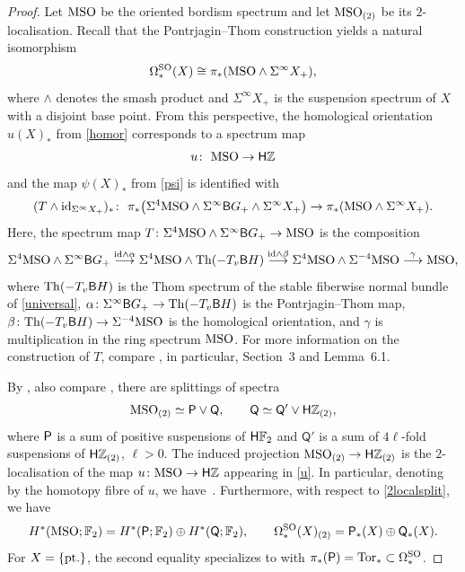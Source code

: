\documentclass[pdftex]{sigma}
\numberwithin{equation}{section}
\newcommand{\F}{\mathbb{F}}
\newcommand{\Z}{\mathbb{Z}}
\newcommand{\SO}{\mathrm{SO}}
\newcommand{\id}{{\rm id}}
\newcommand{\MSO}{{\rm MSO}}
\newcommand{\sB}{{\sf B}}
\newcommand{\Tor}{{\rm Tor}}
\begin{document}
\begin{proof}
Let $\MSO$ be the oriented bordism spectrum and let $\MSO_{(2)}$ be its $2$-localisation.
Recall that the Pontrjagin--Thom construction yields a natural isomorphism
\[
 \Omega^{\SO}_*(X) \cong \pi_*(\MSO \wedge \Sigma^{\infty} X_+),
\]
where $\wedge$ denotes the smash product and $\Sigma^{\infty} X_+$ is the suspension spectrum of $X$ with a disjoint base point.
From this perspective, the homological orientation $u(X)_*$ from \eqref{homor} corresponds to a spectrum map
\begin{equation} \label{u}
 u \colon\ \MSO \to \mathsf{H}\Z
\end{equation}
and the map $\psi(X)_*$ from \eqref{psi} is identified with
\[
(T \wedge \id_{\Sigma^{\infty} X_+})_* \colon\ \pi_*\big( \Sigma^4 \MSO \wedge \Sigma^{\infty} \sB G_+ \wedge \Sigma^{\infty} X_+\big) \to \pi_*(\MSO \wedge \Sigma^{\infty}X_+) .
\]
Here, the spectrum map $T \colon \Sigma^4 \MSO \wedge \Sigma^{\infty} \sB G_+ \to \MSO$ is the composition
\[
 \Sigma^4 \MSO \wedge \Sigma^{\infty} \sB G_+ \stackrel{\id \wedge \alpha}{\longrightarrow} \Sigma^4 \MSO \wedge {\rm Th}(-T_v \sB H) \stackrel{\id \wedge \beta}{\longrightarrow} \Sigma^4 \MSO \wedge \Sigma^{-4} \MSO \stackrel{\gamma}{\longrightarrow} \MSO,
 \]
where ${\rm Th}(-T_v \sB H)$ is the Thom spectrum of the stable fiberwise normal bundle of \eqref{universal}, $\alpha \colon \Sigma^{\infty} \sB G_+ \to {\rm Th}(-T_v \sB H)$ is the Pontrjagin--Thom map, $\beta \colon {\rm Th}(-T_v \sB H) \to \Sigma^{-4} \MSO$ is the homological orientation, and $\gamma$ is multiplication in the ring spectrum $\MSO$.
For more information on the construction of $T$, compare \cite{Fuehring_bordism}, in particular, Section~3 and Lemma~6.1.

By \cite[Theorem 5]{Wall60}, also compare \cite[proof of~Theorem 14.1]{CF}, there are splittings of spectra
\begin{gather} \label{2localsplit}
 \MSO_{(2)} \simeq \sf{P} \vee \sf{Q} , \qquad \sf{Q} \simeq \mathsf{Q'} \vee \mathsf{H} \Z_{(2)},
 \end{gather}
where $\sf{P}$ is a sum of positive suspensions of ${\sf H}\F_2$ and $\mathsf{Q'}$ is a sum of $4\ell$-fold suspensions of ${\sf H}\Z_{(2)}$, $\ell > 0$.
The induced projection $\MSO_{(2)} \to \mathsf{H}\Z_{(2)}$ is the $2$-localisation of the map ${u \colon \MSO \to \mathsf{H}\Z}$ appearing in \eqref{u}.
In particular, denoting by \smash{$\widehat \MSO \subset \MSO$} the homotopy fibre of $u$, we have~\smash{$ ( \widehat \MSO)_{(2)} \simeq \sf{P} \vee \sf{Q'}$}.
Furthermore, with respect to \eqref{2localsplit}, we have
\begin{equation} \label{splitorbord}
 H^*(\MSO; \F_2) = H^*(\mathsf{P}; \F_2) \oplus H^*( \mathsf{Q}; \F_2) , \qquad \Omega^{\SO}_*(X)_{(2)} = \mathsf{P}_*(X) \oplus \mathsf{Q}_*(X) .
\end{equation}
For $X=\{\rm pt.\}$, the second equality specializes to \smash{$\big(\Omega^{\SO}_*\big)_{(2)} = \pi_*( \mathsf{P}) \oplus \pi_*(\mathsf{Q})$} with $\pi_*(\mathsf{P}) = \Tor_* \subset \Omega^{\SO}_*$.


\end{proof}
\end{document}
